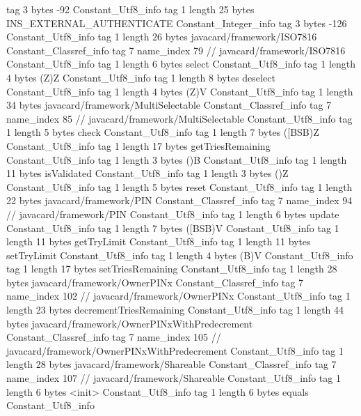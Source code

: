 {{{			tag	3
			bytes	-92
		}
		Constant_Utf8_info {
			tag	1
			length	25
			bytes	INS_EXTERNAL_AUTHENTICATE
		}
		Constant_Integer_info {
			tag	3
			bytes	-126
		}
		Constant_Utf8_info {
			tag	1
			length	26
			bytes	javacard/framework/ISO7816
		}
		Constant_Classref_info {
			tag	7
			name_index	79		// javacard/framework/ISO7816
		}
		Constant_Utf8_info {
			tag	1
			length	6
			bytes	select
		}
		Constant_Utf8_info {
			tag	1
			length	4
			bytes	(Z)Z
		}
		Constant_Utf8_info {
			tag	1
			length	8
			bytes	deselect
		}
		Constant_Utf8_info {
			tag	1
			length	4
			bytes	(Z)V
		}
		Constant_Utf8_info {
			tag	1
			length	34
			bytes	javacard/framework/MultiSelectable
		}
		Constant_Classref_info {
			tag	7
			name_index	85		// javacard/framework/MultiSelectable
		}
		Constant_Utf8_info {
			tag	1
			length	5
			bytes	check
		}
		Constant_Utf8_info {
			tag	1
			length	7
			bytes	([BSB)Z
		}
		Constant_Utf8_info {
			tag	1
			length	17
			bytes	getTriesRemaining
		}
		Constant_Utf8_info {
			tag	1
			length	3
			bytes	()B
		}
		Constant_Utf8_info {
			tag	1
			length	11
			bytes	isValidated
		}
		Constant_Utf8_info {
			tag	1
			length	3
			bytes	()Z
		}
		Constant_Utf8_info {
			tag	1
			length	5
			bytes	reset
		}
		Constant_Utf8_info {
			tag	1
			length	22
			bytes	javacard/framework/PIN
		}
		Constant_Classref_info {
			tag	7
			name_index	94		// javacard/framework/PIN
		}
		Constant_Utf8_info {
			tag	1
			length	6
			bytes	update
		}
		Constant_Utf8_info {
			tag	1
			length	7
			bytes	([BSB)V
		}
		Constant_Utf8_info {
			tag	1
			length	11
			bytes	getTryLimit
		}
		Constant_Utf8_info {
			tag	1
			length	11
			bytes	setTryLimit
		}
		Constant_Utf8_info {
			tag	1
			length	4
			bytes	(B)V
		}
		Constant_Utf8_info {
			tag	1
			length	17
			bytes	setTriesRemaining
		}
		Constant_Utf8_info {
			tag	1
			length	28
			bytes	javacard/framework/OwnerPINx
		}
		Constant_Classref_info {
			tag	7
			name_index	102		// javacard/framework/OwnerPINx
		}
		Constant_Utf8_info {
			tag	1
			length	23
			bytes	decrementTriesRemaining
		}
		Constant_Utf8_info {
			tag	1
			length	44
			bytes	javacard/framework/OwnerPINxWithPredecrement
		}
		Constant_Classref_info {
			tag	7
			name_index	105		// javacard/framework/OwnerPINxWithPredecrement
		}
		Constant_Utf8_info {
			tag	1
			length	28
			bytes	javacard/framework/Shareable
		}
		Constant_Classref_info {
			tag	7
			name_index	107		// javacard/framework/Shareable
		}
		Constant_Utf8_info {
			tag	1
			length	6
			bytes	<init>
		}
		Constant_Utf8_info {
			tag	1
			length	6
			bytes	equals
		}
		Constant_Utf8_info {
}}}
